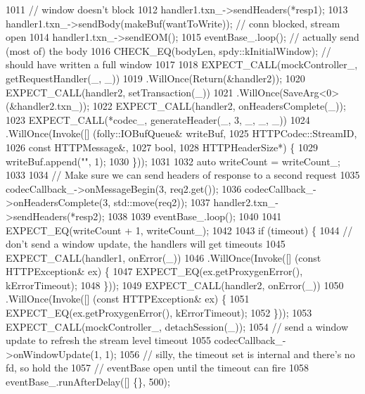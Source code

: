 \begin{DoxyCode}
1011                                                   \textcolor{comment}{// window doesn't block}
1012   handler1.txn\_->sendHeaders(*resp1);
1013   handler1.txn\_->sendBody(makeBuf(wantToWrite)); \textcolor{comment}{// conn blocked, stream open}
1014   handler1.txn\_->sendEOM();
1015   eventBase_.loop(); \textcolor{comment}{// actually send (most of) the body}
1016   CHECK\_EQ(bodyLen, spdy::kInitialWindow); \textcolor{comment}{// should have written a full window}
1017 
1018   EXPECT\_CALL(mockController_, getRequestHandler(\_, \_))
1019     .WillOnce(Return(&handler2));
1020   EXPECT\_CALL(handler2, setTransaction(\_))
1021     .WillOnce(SaveArg<0>(&handler2.txn\_));
1022   EXPECT\_CALL(handler2, onHeadersComplete(\_));
1023   EXPECT\_CALL(*codec_, generateHeader(\_, 3, \_, \_, \_))
1024     .WillOnce(Invoke([] (folly::IOBufQueue& writeBuf,
1025                          HTTPCodec::StreamID,
1026                          \textcolor{keyword}{const} HTTPMessage&,
1027                          \textcolor{keywordtype}{bool},
1028                          HTTPHeaderSize*) \{
1029                        writeBuf.append(\textcolor{stringliteral}{""}, 1);
1030                      \}));
1031 
1032   \textcolor{keyword}{auto} writeCount = writeCount_;
1033 
1034   \textcolor{comment}{// Make sure we can send headers of response to a second request}
1035   codecCallback_->onMessageBegin(3, req2.get());
1036   codecCallback_->onHeadersComplete(3, std::move(req2));
1037   handler2.txn\_->sendHeaders(*resp2);
1038 
1039   eventBase_.loop();
1040 
1041   EXPECT\_EQ(writeCount + 1, writeCount_);
1042 
1043   \textcolor{keywordflow}{if} (timeout) \{
1044     \textcolor{comment}{// don't send a window update, the handlers will get timeouts}
1045     EXPECT\_CALL(handler1, onError(\_))
1046       .WillOnce(Invoke([] (\textcolor{keyword}{const} HTTPException& ex) \{
1047             EXPECT\_EQ(ex.getProxygenError(), kErrorTimeout);
1048           \}));
1049     EXPECT\_CALL(handler2, onError(\_))
1050       .WillOnce(Invoke([] (\textcolor{keyword}{const} HTTPException& ex) \{
1051             EXPECT\_EQ(ex.getProxygenError(), kErrorTimeout);
1052           \}));
1053     EXPECT\_CALL(mockController_, detachSession(\_));
1054     \textcolor{comment}{// send a window update to refresh the stream level timeout}
1055     codecCallback_->onWindowUpdate(1, 1);
1056     \textcolor{comment}{// silly, the timeout set is internal and there's no fd, so hold the}
1057     \textcolor{comment}{// eventBase open until the timeout can fire}
1058     eventBase_.runAfterDelay([] \{\}, 500);

\end{DoxyCode}
